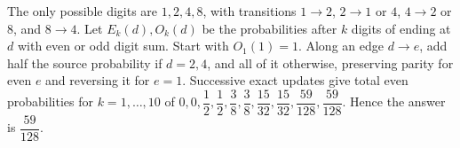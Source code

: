 The only possible digits are $1,2,4,8$, with transitions $1\to2$, $2\to1$ or $4$, $4\to2$ or $8$, and $8\to4$. Let $E_k(d),O_k(d)$ be the probabilities after $k$ digits of ending at $d$ with even or odd digit sum. Start with $O_1(1)=1$. Along an edge $d\to e$, add half the source probability if $d=2,4$, and all of it otherwise, preserving parity for even $e$ and reversing it for $e=1$. Successive exact updates give total even probabilities for $k=1,\ldots,10$ of $0,0,\dfrac{1}{2},\dfrac{1}{2},\dfrac{3}{8},\dfrac{3}{8},\dfrac{15}{32},\dfrac{15}{32},\dfrac{59}{128},\dfrac{59}{128}$. Hence the answer is $\boxed{\dfrac{59}{128}}$.
